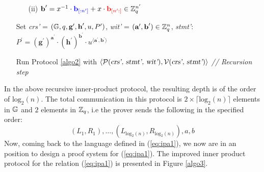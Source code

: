 \begin{mdframed}[skipabove=\topsep]
\begin{itemize}[itemsep=4pt]
\begin{enumerate}[itemsep=5pt]
            \item[(ii)] $\textbf{b}^{\prime} = x^{-1} \cdot
            \textcolor{blue}{\textbf{b}_{[:n^{\prime}]}} + x\cdot
            \textcolor{red}{\textbf{b}_{[n^{\prime}:]}}
            \in \mathbb{Z}^{n^{\prime}}_q$
        \end{enumerate}

        \item[] Set \textsl{crs'} = $(\mathbb{G}, q, \textbf{g}^{\prime}, \textbf{h}^{\prime}, u, P^{\prime})$, \textsl{wit'} = $(\textbf{a}^{\prime}, \textbf{b}^{\prime}) \in \mathbb{Z}_q^n$, \textsl{stmt'}: $P^{\prime} = (\textbf{g}^{\prime})^{\textbf{a}^{\prime}} \cdot (\textbf{h}^{\prime})^{\textbf{b}^{\prime}} \cdot u^{\langle \textbf{a}^{\prime},\textbf{b}^{\prime} \rangle}$
      
        \item[] Run Protocol \ref{algo2} with $\langle \mathcal{P}(\textsl{crs', stmt', wit'}), \mathcal{V}(\textsl{crs', stmt'}) \rangle$  \hfill{\footnotesize \textit{// Recursion step}}
      
    \end{itemize}
\end{mdframed}

In the above recursive inner-product protocol, the resulting depth is of the order of $ \text{log}_2(n)$. The total communication in this protocol is $2 \times \lceil \text{log}_2(n) \rceil$ elements in $\mathbb{G}$ and $2$ elements in $\mathbb{Z}_q$, i.e the prover sends the following in the specified order:
\begin{equation*}
    (L_1, R_1), \dots, (L_{\text{log}_2(n)}, R_{\text{log}_2(n)}), a, b
\end{equation*}
Now, coming back to the language defined in (\ref{eq:ipa1}), we now are in an position to design a proof system for (\ref{eq:ipa1}). 
The improved inner product protocol for the relation (\ref{eq:ipa1}) is presented in Figure \ref{algo3}.
\vspace{0.2cm}

